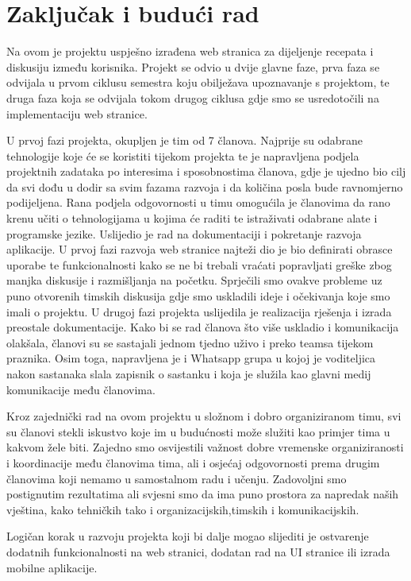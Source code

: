 \chapter{Zaključak i budući rad}
		
		
        Na ovom je projektu uspješno izrađena web stranica za dijeljenje recepata i diskusiju između korisnika. Projekt se odvio u dvije glavne faze, prva faza se odvijala u prvom ciklusu semestra koju obilježava upoznavanje s projektom, te druga faza koja se odvijala tokom drugog ciklusa gdje smo se usredotočili na implementaciju web stranice.
        
        U prvoj fazi projekta, okupljen je tim od 7 članova. Najprije su odabrane tehnologije koje će se koristiti tijekom projekta te je napravljena podjela projektnih zadataka po interesima i sposobnostima članova, gdje je ujedno bio cilj da svi dođu u dodir sa svim fazama razvoja i da količina posla bude ravnomjerno podijeljena. Rana podjela odgovornosti u timu omogućila je članovima da rano krenu učiti o tehnologijama u kojima će raditi te istraživati odabrane alate i programske jezike. Uslijedio je rad na dokumentaciji i pokretanje razvoja aplikacije. U prvoj fazi razvoja web stranice najteži dio je bio definirati obrasce uporabe te funkcionalnosti kako se ne bi trebali vraćati popravljati greške zbog manjka diskusije i razmišljanja na početku. Sprječili smo ovakve probleme uz puno otvorenih timskih diskusija gdje smo uskladili ideje i očekivanja koje smo imali o projektu.
        U drugoj fazi projekta uslijedila je realizacija rješenja i izrada preostale dokumentacije. Kako bi se rad članova što više uskladio i komunikacija olakšala, članovi su se sastajali jednom tjedno uživo i preko teamsa tijekom praznika. Osim toga, napravljena je i Whatsapp grupa u kojoj je voditeljica nakon sastanaka slala zapisnik o sastanku i koja je služila kao glavni medij komunikacije među članovima.
        
        Kroz zajednički rad na ovom projektu u složnom i dobro organiziranom timu, svi su članovi stekli iskustvo koje im u budućnosti može služiti kao primjer tima u kakvom žele biti. Zajedno smo osvijestili važnost dobre vremenske organiziranosti i koordinacije među članovima tima, ali i osjećaj odgovornosti prema drugim članovima koji nemamo u samostalnom radu i učenju. Zadovoljni smo postignutim rezultatima ali svjesni smo da ima puno prostora za napredak naših vještina, kako tehničkih tako i organizacijskih,timskih i komunikacijskih.

        Logičan korak u razvoju projekta koji bi dalje mogao slijediti je ostvarenje dodatnih funkcionalnosti na web stranici, dodatan rad na UI stranice ili izrada mobilne aplikacije.
        
        \eject 